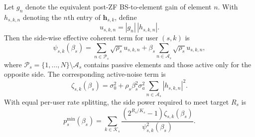 \documentclass[journal]{IEEEtran}
\begin{document}
Let $g_n$ denote the equivalent post-ZF BS-to-element gain of element $n$. With $h_{s,k,n}$ denoting the $n$th entry of $\mathbf{h}_{s,k}$, define
\begin{equation}
u_{s,k,n} = |g_n|\,|h_{s,k,n}|.
\label{eq:un}
\end{equation}
Then the side-wise effective coherent term for user $(s,k)$ is
\begin{equation}
\psi_{s,k}(\beta_s)=
\sum_{n\in\mathcal{P}_s}\sqrt{\rho_s}u_{s,k,n}
+\beta_s\sum_{n\in\mathcal{A}_s}\sqrt{\rho_s}u_{s,k,n},
\label{eq:psi}
\end{equation}
where $\mathcal{P}_s=\{1,\ldots,N\}\setminus\mathcal{A}_s$ contains passive elements and those active only for the opposite side. The corresponding active-noise term is
\begin{equation}
\zeta_{s,k}(\beta_s)=\sigma_0^2+
\rho_s\beta_s^2\sigma_a^2
\sum_{n\in\mathcal{A}_s}|h_{s,k,n}|^2.
\label{eq:noise_exact}
\end{equation}
With equal per-user rate splitting, the side power required to meet target $R_s$ is
\begin{equation}
p_s^{\min}(\beta_s)=
\sum_{k\in\mathcal{K}_s}
\frac{(2^{R_s/K_s}-1)\zeta_{s,k}(\beta_s)}{\psi_{s,k}^2(\beta_s)}.
\label{eq:minsidepower}
\end{equation}

\vspace{-2.5mm}
\end{document}
